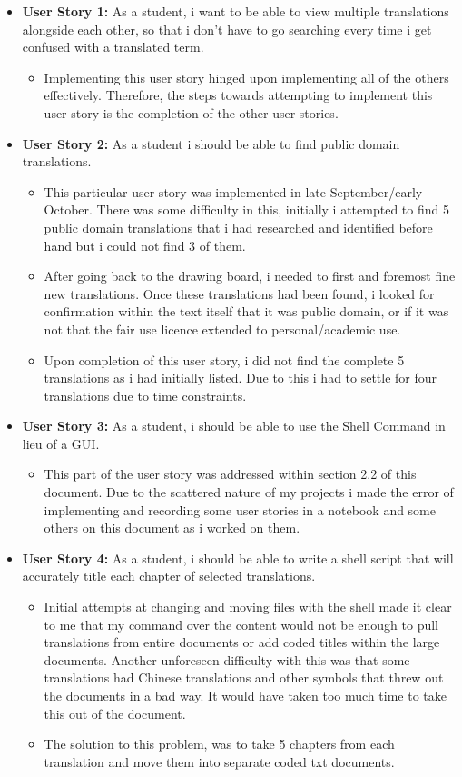 \documentclass{article}
\begin{document}
\begin{itemize}
\item{\textbf{User Story 1:} As a student, i want to be able to view multiple  translations alongside each other, so that i don’t have to go searching every time i get confused with a translated term.}
\begin{itemize}
\item{Implementing this user story hinged upon implementing all of the others effectively. Therefore, the steps towards attempting to implement this user story is the completion of the other user stories.} 
\end{itemize}

\item{\textbf{User Story 2:} As a student i should be able to find public domain translations.}
\begin{itemize}
\item{This particular user story was implemented in late September/early October. There was some difficulty in this, initially i attempted to find 5 public domain translations that i had researched and identified before hand but i could not find 3 of them.}
\item{After going back to the drawing board, i needed to first and foremost fine new translations. Once these translations had been found, i looked for confirmation within the text itself that it was public domain, or if it was not that the fair use licence extended to personal/academic use. }
\item{Upon completion of this user story, i did not find the complete 5 translations as i had initially listed. Due to this i had to settle for four translations due to time constraints.}
\end{itemize}
\item{\textbf{User Story 3:} As a student, i should be able to use the Shell Command in lieu of a GUI.}
\begin{itemize}
\item{This part of the user story was addressed within section 2.2 of this document. Due to the scattered nature of my projects i made the error of implementing and recording some user stories in a notebook and some others on this document as i worked on them.} 
\end{itemize}
\item{\textbf{User Story 4:} As a student, i should be able to write a shell script that will accurately title each chapter of selected translations.}
\begin{itemize}
\item{Initial attempts at changing and moving files with the shell made it clear to me that my command over the content would not be enough to pull translations from entire documents or add coded titles within the large documents. Another unforeseen difficulty with this was that some translations had Chinese translations and other symbols that threw out the documents in a bad way. It would have taken too much time to take this out of the document.}
\item{The solution to this problem, was to take 5 chapters from each translation and move them into separate coded txt documents.}


\end{itemize}
\end{itemize}
\end{document}
